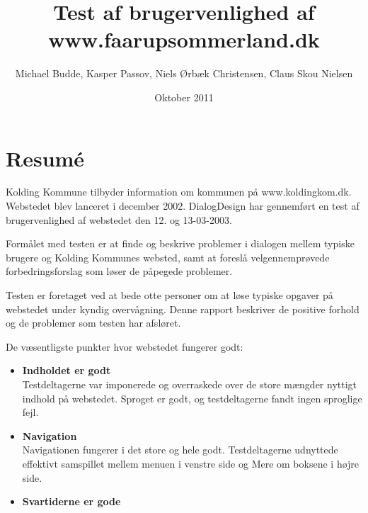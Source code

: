 \documentclass[10pt,a4paper]{article}      %
\author{Michael Budde, Kasper Passov, Niels Ørbæk Christensen, Claus Skou Nielsen}
\title{Test af brugervenlighed af www.faarupsommerland.dk}
\date{Oktober 2011}
\begin{document}
\maketitle
\newpage
\setcounter{page}{1}

\section*{Resumé}
\setcounter{page}{1} %
Kolding Kommune tilbyder information om kommunen på www.koldingkom.dk.
Webstedet blev lanceret i december 2002. DialogDesign  har gennemført en test
af brugervenlighed af webstedet den 12. og 13-03-2003.

Formålet med testen er at finde og beskrive problemer i dialogen
mellem typiske brugere og Kolding Kommunes websted, samt at foreslå
velgennemprøvede forbedringsforslag som løser de påpegede problemer.

Testen er foretaget ved at bede otte personer om at løse typiske
opgaver på webstedet under kyndig overvågning. Denne rapport beskriver de
positive forhold og de problemer som testen har afsløret.

\noindent De væsentligste punkter hvor webstedet fungerer godt:
\begin{itemize}
  \item \textbf{Indholdet er godt}\\ Testdeltagerne var imponerede og overraskede over de store mængder nyttigt indhold på webstedet. Sproget er godt, og testdeltagerne fandt ingen sproglige fejl.
  \item \textbf{Navigation}\\ Navigationen fungerer i det store og hele godt. Testdeltagerne udnyttede effektivt samspillet mellem menuen i venstre side og Mere om boksene i højre side.
  \item \textbf{Svartiderne er gode}
\end{itemize}
\end{document}
